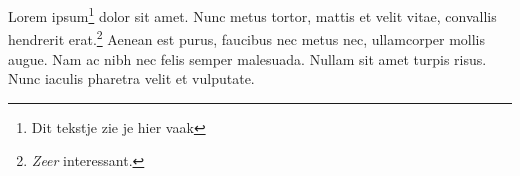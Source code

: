 \documentclass{article}
\begin{document}
    Lorem ipsum\footnote{Dit tekstje zie je hier vaak\textellipsis} dolor sit
    amet. Nunc metus tortor, mattis et velit vitae, convallis hendrerit
    erat.\footnote{\emph{Zeer} interessant.}
    Aenean est purus, faucibus nec metus nec, ullamcorper mollis augue. Nam ac
    nibh nec felis semper malesuada. Nullam sit amet turpis risus. Nunc iaculis
    pharetra velit et vulputate.
\end{document}

